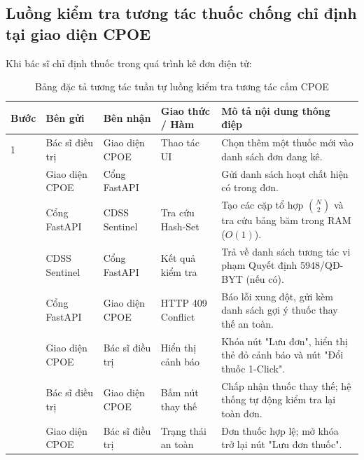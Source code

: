 \subsection{Luồng kiểm tra tương tác thuốc chống chỉ định tại giao diện CPOE}
Khi bác sĩ chỉ định thuốc trong quá trình kê đơn điện tử:

\begin{table}[htbp]
\centering
\small
\renewcommand{\arraystretch}{1.15}
\begin{tabularx}{\textwidth}{C{1.0cm} L{3.0cm} L{3.0cm} L{2.5cm} Y}
\toprule
\textbf{Bước} & \textbf{Bên gửi} & \textbf{Bên nhận} & \textbf{Giao thức / Hàm} & \textbf{Mô tả nội dung thông điệp} \\
 & Bác sĩ điều trị & Giao diện CPOE & Thao tác UI & Chọn thêm một thuốc mới vào danh sách đơn đang kê. \\
 & Giao diện CPOE & Cổng FastAPI &  & Gửi danh sách hoạt chất hiện có trong đơn. \\
 & Cổng FastAPI & CDSS Sentinel & Tra cứu Hash-Set & Tạo các cặp tổ hợp $\binom{N}{2}$ và tra cứu bảng băm trong RAM ($O(1)$). \\
 & CDSS Sentinel & Cổng FastAPI & Kết quả kiểm tra & Trả về danh sách tương tác vi phạm Quyết định 5948/QĐ-BYT (nếu có). \\
 & Cổng FastAPI & Giao diện CPOE & HTTP 409 Conflict & Báo lỗi xung đột, gửi kèm danh sách gợi ý thuốc thay thế an toàn. \\
 & Giao diện CPOE & Bác sĩ điều trị & Hiển thị cảnh báo & Khóa nút "Lưu đơn", hiển thị thẻ đỏ cảnh báo và nút "Đổi thuốc 1-Click". \\
 & Bác sĩ điều trị & Giao diện CPOE & Bấm nút thay thế & Chấp nhận thuốc thay thế; hệ thống tự động kiểm tra lại toàn đơn. \\
 & Giao diện CPOE & Bác sĩ điều trị & Trạng thái an toàn & Đơn thuốc hợp lệ; mở khóa trở lại nút "Lưu đơn thuốc". \\
\bottomrule
\end{tabularx}
\caption{Bảng đặc tả tương tác tuần tự luồng kiểm tra tương tác cấm CPOE}
\label{tab:seq_ddi_check}
\end{table}
